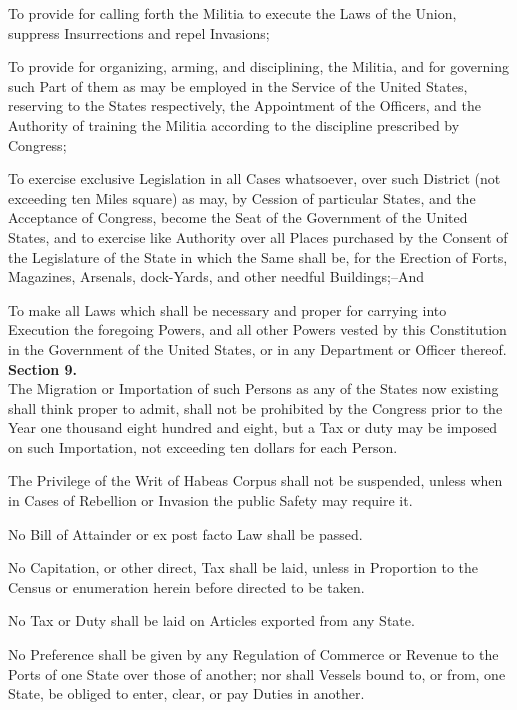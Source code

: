 To provide for calling forth the Militia to execute the Laws of the Union, suppress Insurrections and repel Invasions;

To provide for organizing, arming, and disciplining, the Militia, and for governing such Part of them as may be employed in the Service of the United States, reserving to the States respectively, the Appointment of the Officers, and the Authority of training the Militia according to the discipline prescribed by Congress;

To exercise exclusive Legislation in all Cases whatsoever, over such District (not exceeding ten Miles square) as may, by Cession of particular States, and the Acceptance of Congress, become the Seat of the Government of the United States, and to exercise like Authority over all Places purchased by the Consent of the Legislature of the State in which the Same shall be, for the Erection of Forts, Magazines, Arsenals, dock-Yards, and other needful Buildings;--And

To make all Laws which shall be necessary and proper for carrying into Execution the foregoing Powers, and all other Powers vested by this Constitution in the Government of the United States, or in any Department or Officer thereof.\\[0.01in]

{\large \textbf{Section 9.}}\\[0.01in]

The Migration or Importation of such Persons as any of the States now existing shall think proper to admit, shall not be prohibited by the Congress prior to the Year one thousand eight hundred and eight, but a Tax or duty may be imposed on such Importation, not exceeding ten dollars for each Person.

The Privilege of the Writ of Habeas Corpus shall not be suspended, unless when in Cases of Rebellion or Invasion the public Safety may require it.

No Bill of Attainder or ex post facto Law shall be passed.

No Capitation, or other direct, Tax shall be laid, unless in Proportion to the Census or enumeration herein before directed to be taken.

No Tax or Duty shall be laid on Articles exported from any State.

No Preference shall be given by any Regulation of Commerce or Revenue to the Ports of one State over those of another; nor shall Vessels bound to, or from, one State, be obliged to enter, clear, or pay Duties in another.

